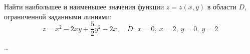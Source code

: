 \begin{problem}
Найти наибольшее и наименьшее значения функции \( z = z(x, y) \) в области \( D \), ограниченной заданными линиями:
\[ z = x^{2} - 2xy + \frac{5}{2}y^2 - 2x, \quad D:\ x=0,\ x=2,\ y=0,\ y=2 \]
\end{problem}

\begin{solution}
  \dots
\end{solution}